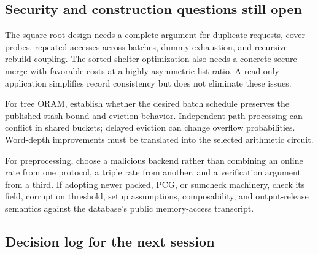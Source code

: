 \documentclass[11pt]{article}
\begin{document}
\subsection{Security and construction questions still open}

The square-root design needs a complete argument for duplicate requests,
cover probes, repeated accesses across batches, dummy exhaustion, and recursive
rebuild coupling. The sorted-shelter optimization also needs a concrete secure
merge with favorable costs at a highly asymmetric list ratio. A read-only
application simplifies record consistency but does not eliminate these issues.

For tree ORAM, establish whether the desired batch schedule preserves the
published stash bound and eviction behavior. Independent path processing can
conflict in shared buckets; delayed eviction can change overflow probabilities.
Word-depth improvements must be translated into the selected arithmetic circuit.

For preprocessing, choose a malicious backend rather than combining an online
rate from one protocol, a triple rate from another, and a verification argument
from a third. If adopting newer packed, PCG, or sumcheck machinery, check its
field, corruption threshold, setup assumptions, composability, and output-release
semantics against the database's public memory-access transcript.

\subsection{Decision log for the next session}
\end{document}
